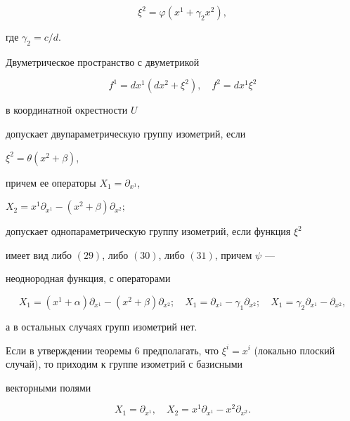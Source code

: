\begin{equation}


\xi^2=\varphi(x^1+\gamma_2x^2),


\end{equation}


где $\gamma_2=c/d$.





\begin{thm}


Двуметрическое пространство с двуметрикой


$$


f^1=dx^1(dx^2+\xi^2),\quad f^2=dx^1\xi^2


$$


в координатной окрестности $U$


допускает двупараметрическую группу изометрий, если


$\xi^2=\theta(x^2+\beta)$,


причем ее операторы $X_1=\partial_{x^1}$,


$X_2=x^1\partial_{x^1} - (x^2+\beta)\partial_{x^2};$


допускает однопараметрическую группу изометрий, если функция $\xi^2$


имеет вид либо $(29)$, либо $(30)$, либо $(31)$, причем $\psi$ ---


неоднородная функция, с операторами


$$


X_1=(x^1+\alpha)\partial_{x^1} - (x^2+\beta)\partial_{x^2};\quad


X_1=\partial_{x^1} - \gamma_1\partial_{x^2};\quad


X_1=\gamma_2\partial_{x^1} - \partial_{x^2},


$$


а в остальных случаях групп изометрий нет.


\end{thm}





\begin{cornonum}


Если в утверждении теоремы 6 предполагать, что $\xi^i =


x^i$ (локально плоский случай), то приходим к группе изометрий с базисными


векторными полями


\begin{equation}


X_1=\partial_{x^1},\quad


X_2=x^1\partial_{x^1} - x^2\partial_{x^2}.


\end{equation}


\end{cornonum}





